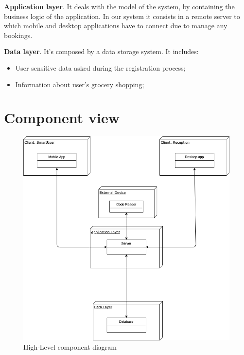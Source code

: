 \textbf{Application layer}. It deals with the model of the system, by containing the business logic of the application. In our system it consists in a remote server to which mobile and desktop applications have to connect due to manage any bookings.

\textbf{Data layer}. It's composed by a data storage system. It includes: 

\begin{itemize}
\item User sensitive data asked during the registration process;
\item Information about user's grocery shopping;
\end{itemize}



\section{Component view}


\begin{figure}[H]
  \label{fig:highlevel}
  \centering
  \includegraphics[scale=0.25]{diagrams/h_level.png}
  \caption{High-Level component diagram}
\end{figure}


